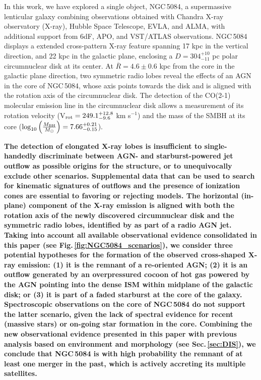 \documentclass[modern]{CORE-AAS/aastex631}
\begin{document}
In this work, we have explored a single object, NGC\,5084, a supermassive lenticular galaxy combining observations obtained with Chandra X-ray observatory (X-ray), Hubble Space Telescope, EVLA, and ALMA, with additional support from 6dF, APO, and VST/ATLAS observations. NGC\,5084 displays a extended cross-pattern X-ray feature spanning 17 kpc in the vertical direction, and 22 kpc in the galactic plane, enclosing a $D=304^{+10}_{-11}$ pc polar circumnuclear disk at its center. At $\overline{R}=4.6\pm0.6$ kpc from the core in the galactic plane direction, two symmetric radio lobes reveal the effects of an AGN in the core of NGC\,5084, whose axis points towards the disk and is aligned with the rotation axis of the circumnuclear disk. The detection of the CO(2-1) molecular emission line in the circumnuclear disk allows a measurement of its rotation velocity (V$_{\rm rot} = 249.1^{+12.8}_{-9.6}$ km s$^{-1}$) and the mass of the SMBH at its core ($\log_{10}\left( \frac{M_{\rm BH}}{M_{\odot}} \right) = 7.66^{+0.21}_{-0.15}$). \par 

\textbf{The detection of elongated X-ray lobes is insufficient to single-handedly discriminate between AGN- and starburst-powered jet outflow as possible origins for the structure, or to unequivocally exclude other scenarios. Supplemental data that can be used to search for kinematic signatures of outflows and the presence of ionization cones are essential to favoring or rejecting models.   
The horizontal (in-plane) component of the X-ray emission is aligned with both the rotation axis of the newly discovered circumnuclear disk and the symmetric radio lobes, identified by \citet{irwin+2019aj158_21} as part of a radio AGN jet. Taking into account all available observational evidence consolidated in this paper (see Fig.\,\ref{fig:NGC5084_scenarios}), we consider three potential hypotheses for the formation of the observed cross-shaped X-ray emission: (1) it is the remnant of a re-oriented AGN; (2) it is an outflow generated by an overpressured cocoon of hot gas powered by the AGN pointing into the dense ISM within midplane of the galactic disk; or (3) it is part of a faded starburst at the core of the galaxy. Spectroscopic observations on the core of NGC\,5084 do not support the latter scenario, given the lack of spectral evidence for recent (massive stars) or on-going star formation in the core.  Combining the new observational evidence presented in this paper with previous analysis based on environment and morphology (see Sec.\,\ref{sec:DIS}), we conclude that NGC\,5084 is with high probability the remnant of at least one merger in the past, which is actively accreting its multiple satellites.}
\end{document}
